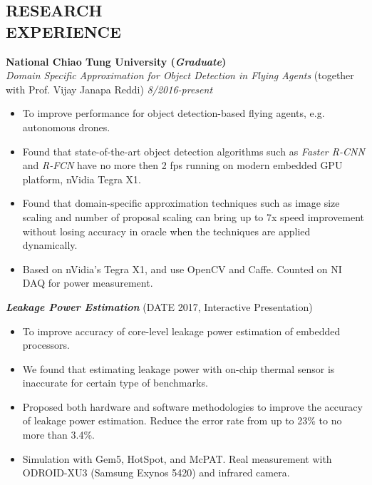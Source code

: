\documentclass[margin, 9pt]{res} %
\begin{document}
\begin{resume}

\section{RESEARCH\\ EXPERIENCE}

{\large\textbf{National Chiao Tung University (\textit{Graduate})}}\\


{\large\textit{Domain Specific Approximation for Object Detection in Flying Agents} (together with Prof. Vijay Janapa Reddi)} \hfill\textit{8/2016-present}\\
\vspace*{-7pt}
\begin{itemize}[leftmargin=*] \itemsep -3pt
\vspace*{-5pt}
  \item To improve performance for object detection-based flying agents, e.g.
  autonomous drones.
  \item Found that state-of-the-art object detection algorithms such as
  \textit{Faster R-CNN} and \textit{R-FCN} have no more then 2 fps running on
  modern embedded GPU platform, nVidia Tegra X1.
	\item Found that domain-specific approximation techniques such as image size
  scaling and number of proposal scaling can bring up to 7x speed improvement
  without losing accuracy in oracle when the techniques are applied dynamically.
  \item Based on nVidia's Tegra X1, and use OpenCV and Caffe. Counted on NI DAQ
  for power measurement.
\end{itemize}
\vspace*{-7pt}

\medskip

{\large \textbf{\textit{Leakage Power Estimation}} \hfill(DATE 2017, Interactive Presentation)}\\
\vspace*{-10pt}
\begin{itemize}[leftmargin=*] \itemsep -3pt
\vspace*{-5pt}
  \item To improve accuracy of core-level leakage power estimation of embedded
  processors.
  \item We found that estimating leakage power with on-chip thermal sensor is
  inaccurate for certain type of benchmarks.
  \item Proposed both hardware and software methodologies to improve the
  accuracy of leakage power estimation. Reduce the error rate from up to 23\% to
  no more than 3.4\%.
  \item Simulation with Gem5, HotSpot, and McPAT. Real measurement with
  ODROID-XU3 (Samsung Exynos 5420) and infrared camera.
\end{itemize}


\end{resume}
\end{document}
